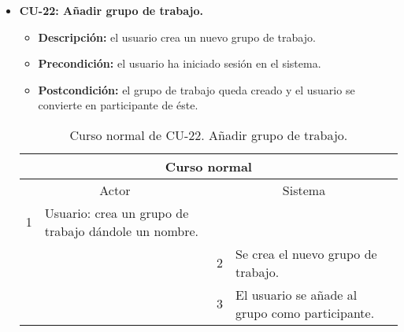 \begin{itemize}
	\item \textbf{CU-22: Añadir grupo de trabajo.}
	\begin{itemize}
		\item \textbf{Descripción:} el usuario crea un nuevo grupo de trabajo.
		\item \textbf{Precondición:} el usuario ha iniciado sesión en el sistema.
		\item \textbf{Postcondición:} el grupo de trabajo queda creado y el usuario se convierte en participante de éste.
	\end{itemize}
	\begin{table}[H]
		\centering
		\begin{tabular}{|p{0.3cm}|p{5cm}|p{0.3cm}|p{5cm}|}
			\hline
			\multicolumn{4}{|c|}{Curso normal} \\ \hline
			\multicolumn{2}{|c|}{Actor} & \multicolumn{2}{|c|}{Sistema} \\ \hline
			1 & Usuario: crea un grupo de trabajo dándole un nombre. &  &  \\ \hline
			&  & 2 & Se crea el nuevo grupo de trabajo. \\ \hline
			&  & 3 & El usuario se añade al grupo como participante. \\ \hline
		\end{tabular}
		\caption{Curso normal de CU-22. Añadir grupo de trabajo.}
		\label{tabla:cu22-normal}
	\end{table}
\end{itemize}

